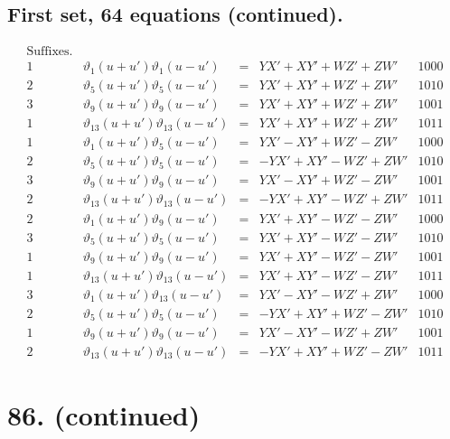 \documentclass[11pt,a4paper]{article}
\newcommand{\uth}[1]{\vartheta_{#1}}
\begin{document}
\subsection*{First set, 64 equations (continued).}

\[
\begin{array}{ccccc}
\text{Suffixes.} & & & & \\
\hline
1 & \uth{1}(u+u')\uth{1}(u-u') &=& YX' + XY' + WZ' + ZW' & 1000 \\
2 & \uth{5}(u+u')\uth{5}(u-u') &=& YX' + XY' + WZ' + ZW' & 1010 \\
3 & \uth{9}(u+u')\uth{9}(u-u') &=& YX' + XY' + WZ' + ZW' & 1001 \\
1 & \uth{13}(u+u')\uth{13}(u-u') &=& YX' + XY' + WZ' + ZW' & 1011 \\
\hline
1 & \uth{1}(u+u')\uth{5}(u-u') &=& YX' - XY' + WZ' - ZW' & 1000 \\
2 & \uth{5}(u+u')\uth{5}(u-u') &=& -YX' + XY' - WZ' + ZW' & 1010 \\
3 & \uth{9}(u+u')\uth{9}(u-u') &=& YX' - XY' + WZ' - ZW' & 1001 \\
2 & \uth{13}(u+u')\uth{13}(u-u') &=& -YX' + XY' - WZ' + ZW' & 1011 \\
\hline
2 & \uth{1}(u+u')\uth{9}(u-u') &=& YX' + XY' - WZ' - ZW' & 1000 \\
3 & \uth{5}(u+u')\uth{5}(u-u') &=& YX' + XY' - WZ' - ZW' & 1010 \\
1 & \uth{9}(u+u')\uth{9}(u-u') &=& YX' + XY' - WZ' - ZW' & 1001 \\
1 & \uth{13}(u+u')\uth{13}(u-u') &=& YX' + XY' - WZ' - ZW' & 1011 \\
\hline
3 & \uth{1}(u+u')\uth{13}(u-u') &=& YX' - XY' - WZ' + ZW' & 1000 \\
2 & \uth{5}(u+u')\uth{5}(u-u') &=& -YX' + XY' + WZ' - ZW' & 1010 \\
1 & \uth{9}(u+u')\uth{9}(u-u') &=& YX' - XY' - WZ' + ZW' & 1001 \\
2 & \uth{13}(u+u')\uth{13}(u-u') &=& -YX' + XY' + WZ' - ZW' & 1011
\end{array}
\]

\newpage
\section*{86. (continued)}
\label{sec:86cont2}
\end{document}
